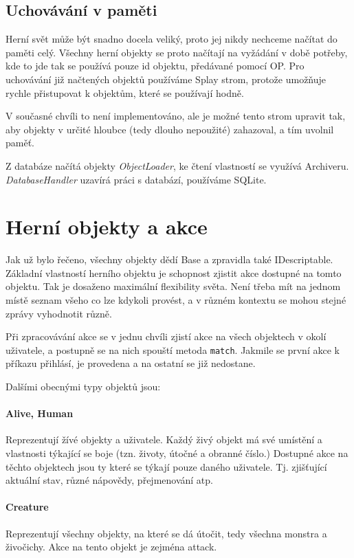\documentclass[11pt, a4paper]{article}
\def\class#1{\emph{#1}}
\begin{document}
\subsection{Uchovávání v paměti}

Herní svět může být snadno docela veliký, proto jej nikdy nechceme načítat do paměti celý. Všechny herní objekty se proto načítají na vyžádání v době potřeby, kde to jde tak se používá pouze id objektu, předávané pomocí OP. Pro uchovávání již načtených objektů používáme Splay strom, protože umožňuje rychle přistupovat k objektům, které se používají hodně.

V současné chvíli to není implementováno, ale je možné tento strom upravit tak, aby objekty v určité hloubce (tedy dlouho nepoužité) zahazoval, a tím uvolnil paměť.

Z databáze načítá objekty \class{ObjectLoader}, ke čtení vlastností se využívá Archiveru. \class{DatabaseHandler} uzavírá práci s databází, používáme SQLite.

\section{Herní objekty a akce}

Jak už bylo řečeno, všechny objekty dědí Base a zpravidla také IDescriptable. Základní vlastností herního objektu je schopnost zjistit akce dostupné na tomto objektu. Tak je dosaženo maximální flexibility světa. Není třeba mít na jednom místě seznam všeho co lze kdykoli provést, a v různém kontextu se mohou stejné zprávy vyhodnotit různě. 

Při zpracovávání akce se v jednu chvíli zjistí akce na všech objektech v okolí uživatele, a postupně se na nich spouští metoda \texttt{match}. Jakmile se první akce k příkazu přihlásí, je provedena a na ostatní se již nedostane.

Dalšími obecnými typy objektů jsou:

\paragraph{Alive, Human} Reprezentují žívé objekty a uživatele. Každý živý objekt má své umístění a vlastnosti týkající se boje (tzn. životy, útočné a obranné číslo.) Dostupné akce na těchto objektech jsou ty které se týkají pouze daného uživatele. Tj. zjišťující aktuální stav, různé nápovědy, přejmenování atp.

\paragraph{Creature} Reprezentují všechny objekty, na které se dá útočit, tedy všechna monstra a živočichy. Akce na tento objekt je zejména attack.
\end{document}

